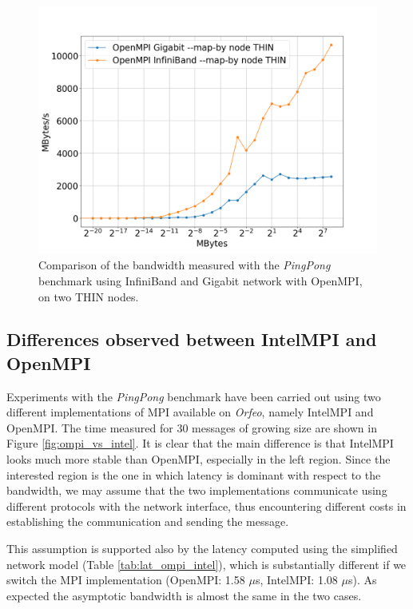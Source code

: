 \documentclass{article}
\begin{document}
\begin{figure}[t]
    \centering
    \includegraphics[width=\textwidth]{benchmark/infi_vs_giga_node_bandw.png}
    \caption{Comparison of the bandwidth measured with the \emph{PingPong} benchmark using InfiniBand and Gigabit network with OpenMPI, on two THIN nodes.}
    \label{fig:infi_vs_giga_bandwidth}
\end{figure}

\subsection{Differences observed between IntelMPI and OpenMPI}
Experiments with the \emph{PingPong} benchmark have been carried out using two different implementations of MPI available on \emph{Orfeo}, namely IntelMPI and OpenMPI. The time measured for 30 messages of growing size are shown in Figure \ref{fig:ompi_vs_intel}. It is clear that the main difference is that IntelMPI looks much more stable than OpenMPI, especially in the left region. Since the interested region is the one in which latency is dominant with respect to the bandwidth, we may assume that the two implementations communicate using different protocols with the network interface, thus encountering different costs in establishing the communication and sending the message.

This assumption is supported also by the latency computed using the simplified network model (Table \ref{tab:lat_ompi_intel}), which is substantially different if we switch the MPI implementation (OpenMPI: 1.58 $\mu$s, IntelMPI: 1.08 $\mu$s). As expected the asymptotic bandwidth is almost the same in the two cases.
\end{document}
